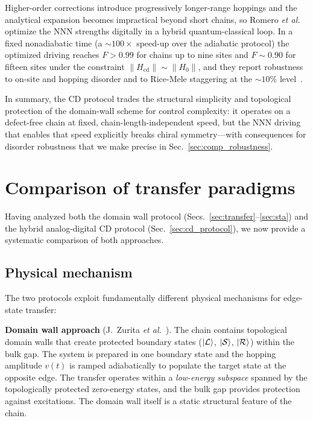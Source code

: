 \documentclass[
  reprint,
  amsmath,
  amssymb,
  aps,
  prb,
  floatfix,
  longbibliography,
]{revtex4-2}
\newcommand{\ketL}{\ket{\mathcal{L}}}
\newcommand{\ketS}{\ket{\mathcal{S}}}
\newcommand{\ketR}{\ket{\mathcal{R}}}
\begin{document}
Higher-order corrections introduce progressively longer-range hoppings and the analytical
expansion becomes impractical beyond short chains, so Romero \textit{et al.} optimize the NNN
strengths digitally in a hybrid quantum-classical loop. In a fixed nonadiabatic time (a
$\sim\!100\times$ speed-up over the adiabatic protocol) the optimized driving reaches $F>0.99$
for chains up to nine sites and $F\sim0.90$ for fifteen sites under the constraint
$\lVert H_{\mathrm{cd}}\rVert\sim\lVert H_0\rVert$, and they report robustness to on-site and
hopping disorder and to Rice-Mele staggering at the $\sim\!10\%$ level~\cite{Romero2024}.

In summary, the CD protocol trades the structural simplicity and topological protection of the
domain-wall scheme for control complexity: it operates on a defect-free chain at fixed,
chain-length-independent speed, but the NNN driving that enables that speed explicitly breaks
chiral symmetry---with consequences for disorder robustness that we make precise in
Sec.~\ref{sec:comp_robustness}.

\section{Comparison of transfer paradigms}
\label{sec:comparison}

Having analyzed both the domain wall protocol
(Secs.~\ref{sec:transfer}--\ref{sec:sta}) and the hybrid analog-digital
CD protocol (Sec.~\ref{sec:cd_protocol}), we now provide a systematic
comparison of both approaches.

\subsection{Physical mechanism}
\label{sec:comp_mechanism}

The two protocols exploit fundamentally different physical mechanisms for
edge-state transfer:

\textbf{Domain wall approach} (J.~Zurita \textit{et al.}~\cite{Zurita2023}).
The chain contains topological domain walls that create protected boundary
states ($\ketL$, $\ketS$, $\ketR$) within the bulk gap. The system is
prepared in one boundary state and the hopping amplitude $v(t)$ is ramped
adiabatically to populate the target state at the opposite edge.
The transfer operates within a \emph{low-energy subspace} spanned by the
topologically protected zero-energy states, and the bulk gap provides
protection against excitations. The domain wall itself is a static
structural feature of the chain.
\end{document}
